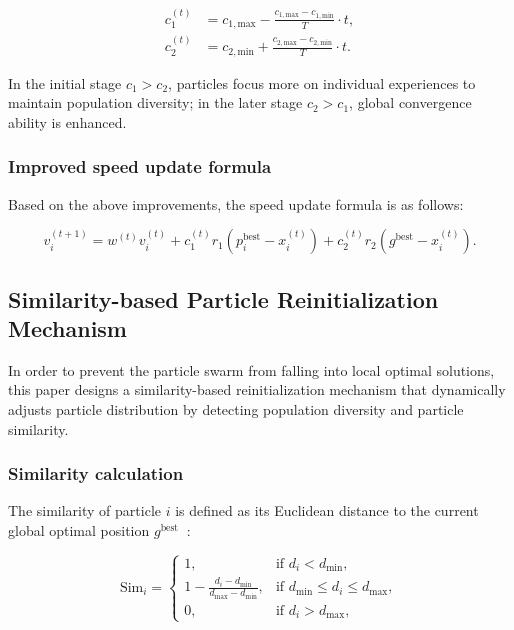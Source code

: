 \documentclass[lettersize,journal]{IEEEtran}
\begin{document}
\begin{equation}
  \begin{aligned}
    c_{1}^{(t)} & = c_{1,\text{max}} - \frac{c_{1,\text{max}} - c_{1,\text{min}}}{T} \cdot t, \\
    c_{2}^{(t)} & = c_{2,\text{min}} + \frac{c_{2,\text{max}} - c_{2,\text{min}}}{T} \cdot t.
  \end{aligned}
  \label{eq:learning_factors_dynamic}
\end{equation}

In the initial stage \(c_{1} > c_{2}\), particles focus more on individual experiences to maintain population diversity; in the later stage \(c_{2} > c_{1}\), global convergence ability is enhanced.

\subsubsection{Improved speed update
  formula}\label{improved-speed-update-formula}

Based on the above improvements, the speed update formula is as follows:

\begin{equation}
  v_{i}^{(t+1)} = w^{(t)}v_{i}^{(t)} + c_{1}^{(t)}r_{1}(p_{i}^{\text{best}} - x_{i}^{(t)}) + c_{2}^{(t)}r_{2}(g^{\text{best}} - x_{i}^{(t)}).
  \label{eq:speed_update_formula}
\end{equation}

\subsection{Similarity-based Particle Reinitialization
  Mechanism}\label{c -similarity-based-particle-reinitialization-mechanism}

In order to prevent the particle swarm from falling into local optimal solutions, this paper designs a similarity-based reinitialization mechanism that dynamically adjusts particle distribution by detecting
population diversity and particle similarity.

\subsubsection{Similarity calculation}\label{similarity-calculation}

The similarity of particle \(i\) is defined as its Euclidean distance to
the current global optimal position \(g^{\text{best~}}\) :

\begin{equation}
  \text{Sim}_{i} = \begin{cases}
    1,                                                                  & \text{if } d_{i} < d_{\text{min}},                        \\
    1 - \frac{d_{i} - d_{\text{min}}}{d_{\text{max}} - d_{\text{min}}}, & \text{if } d_{\text{min}} \leq d_{i} \leq d_{\text{max}}, \\
    0,                                                                  & \text{if } d_{i} > d_{\text{max}},
  \end{cases}
  \label{eq:similarity}
\end{equation}
\end{document}
